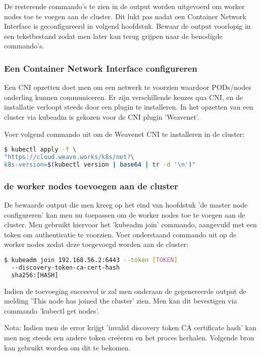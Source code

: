De resterende commando's te zien in de output worden uitgevoerd om worker nodes toe te voegen aan de cluster. Dit lukt pas nadat een Container Network Interface is geconfigureerd in volgend hoofdstuk. Bewaar de output voorlopig in een tekstbestand zodat men later kan terug grijpen naar de benodigde commando's.

\subsubsection{Een Container Network Interface configureren}

Een CNI opzetten doet men om een netwerk te voorzien waardoor PODs/nodes onderling kunnen communiceren. Er zijn verschillende keuzes qua CNI, en de installatie verloopt steeds door een plugin te installeren. In het opzetten van een cluster via kubeadm is gekozen voor de CNI plugin 'Weavenet'. \autocite{Weaveworks2022}

Voer volgend commando uit om de Weavenet CNI te installeren in de cluster: 
\begin{lstlisting}[language=bash]
$ kubectl apply -f \
"https://cloud.weave.works/k8s/net?\
k8s-version=$(kubectl version | base64 | tr -d '\n')"
\end{lstlisting}

\subsubsection{de worker nodes toevoegen aan de cluster}

De bewaarde output die men kreeg op het eind van hoofdstuk 'de master node configureren' kan men nu toepassen om de worker nodes toe te voegen aan de cluster. 
Men gebruikt hiervoor het 'kubeadm join' commando, aangevuld met een token om authenticatie te voorzien. Voer onderstaand commando uit op de worker nodes zodat deze toegevoegd worden aan de cluster:
\begin{lstlisting}[language=bash]
$ kubeadm join 192.168.56.2:6443 --token [TOKEN] 
  --discovery-token-ca-cert-hash
  sha256:[HASH]
\end{lstlisting} 

Indien de toevoeging succesvol is zal men onderaan de gegenereerde output de melding 'This node has joined the cluster' zien. Men kan dit bevestigen via commando 'kubectl get nodes'. 

Nota: Indien men de error krijgt 'invalid discovery token CA certificate hash' kan men nog steeds een andere token creëeren en het proces herhalen. Volgende bron kan gebruikt worden om dit te bekomen. \autocite{Mukul2020} 

